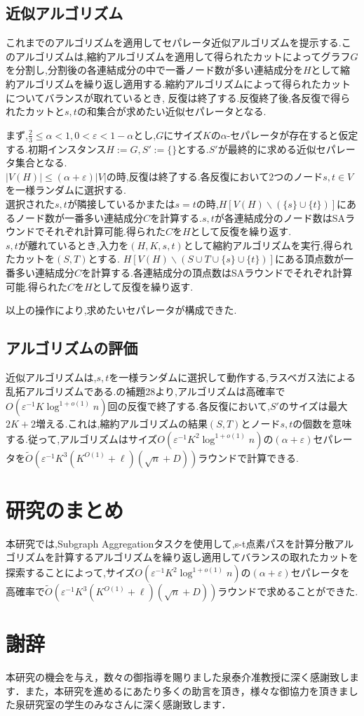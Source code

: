 \documentclass{thesis}
\theoremstyle{definition}
\begin{document}
\section{近似アルゴリズム}
これまでのアルゴリズムを適用してセパレータ近似アルゴリズムを提示する.このアルゴリズムは,縮約アルゴリズムを適用して得られたカットによってグラフ$G$を分割し,分割後の各連結成分の中で一番ノード数が多い連結成分を$H$として縮約アルゴリズムを繰り返し適用する.縮約アルゴリズムによって得られたカットについてバランスが取れているとき, 反復は終了する.反復終了後,各反復で得られたカットと$s,t$の和集合が求めたい近似セパレータとなる.\par
まず,$\frac{2}{3} \leq \alpha < 1,0 < \varepsilon < 1-\alpha$とし,$G$にサイズ$K$の$\alpha$-セパレータが存在すると仮定する.初期インスタンス$H:=G,S':= \{\}$とする.$S'$が最終的に求める近似セパレータ集合となる.\\
$|V(H)|\leq (\alpha + \varepsilon)|V|$の時,反復は終了する.各反復において2つのノード$s,t \in V$を一様ランダムに選択する.\\
選択された$s,t$が隣接しているかまたは$s = t$の時,$H[V(H) \backslash (\{s\} \cup \{t\})]$にあるノード数が一番多い連結成分$C$を計算する.$s,t$が各連結成分のノード数はSAラウンドでそれぞれ計算可能.得られた$C$を$H$として反復を繰り返す.\\
$s,t$が離れているとき,入力を$(H,K,s,t)$として縮約アルゴリズムを実行,得られたカットを$(S,T)$とする.
$H[V(H) \backslash (S \cup T \cup \{s\} \cup \{t\})]$にある頂点数が一番多い連結成分$C$を計算する.各連結成分の頂点数はSAラウンドでそれぞれ計算可能.得られた$C$を$H$として反復を繰り返す.\par
以上の操作により,求めたいセパレータが構成できた.

\section{アルゴリズムの評価}
近似アルゴリズムは,$s,t$を一様ランダムに選択して動作する,ラスベガス法による乱拓アルゴリズムである.\cite{brandt2017approximating}の補題28より,アルゴリズムは高確率で$O(\varepsilon^{-1}K\log^{1+o(1)}n)$回の反復で終了する.各反復において,$S'$のサイズは最大$2K+2$増える.これは,縮約アルゴリズムの結果$(S,T)$とノード$s,t$の個数を意味する.従って,アルゴリズムはサイズ$O(\varepsilon^{-1}K^2\log^{1+o(1)}n)$の$(\alpha + \varepsilon)$セパレータを$\tilde{O}(\varepsilon^{-1}K^3(K^{O(1)}+\ell)(\sqrt{n}+D))$ラウンドで計算できる.

\chapter{研究のまとめ}
本研究では,Subgraph Aggregationタスクを使用して,s-t点素パスを計算分散アルゴリズムを計算するアルゴリズムを繰り返し適用してバランスの取れたカットを探索することによって,サイズ$O(\varepsilon^{-1}K^2\log^{1+o(1)}n)$の$(\alpha + \varepsilon)$セパレータを高確率で$\tilde{O}(\varepsilon^{-1}K^3(K^{O(1)}+\ell)(\sqrt{n}+D))$ラウンドで求めることができた.

\chapter{謝辞}
本研究の機会を与え，数々の御指導を賜りました泉泰介准教授に深く感謝致します．また，本研究を進めるにあたり多くの助言を頂き，様々な御協力を頂きました泉研究室の学生のみなさんに深く感謝致します．




%
\end{document}
